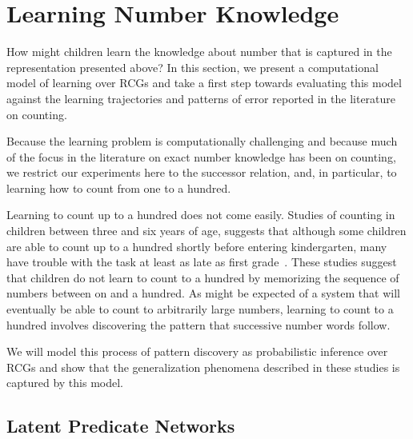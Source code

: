 \documentclass[10pt,letterpaper]{article}
\begin{document}
\section{Learning Number Knowledge}

How might children learn the knowledge about number that is captured
in the representation presented above? In this section, we present a
computational model of learning over RCGs and take a first step
towards evaluating this model against the learning trajectories and
patterns of error reported in the literature on counting. 

Because the learning problem is computationally challenging and
because much of the focus in the literature on exact number knowledge
has been on counting, we restrict our experiments here to the
successor relation, and, in particular, to learning how to count from
one to a hundred.

Learning to count up to a hundred does not come easily. Studies of
counting in children between three and six years of age, suggests that
although some children are able to count up to a hundred shortly
before entering kindergarten, many have trouble with the task at least
as late as first
grade~\cite{FusRicBriar1982,miller1987counting}. These studies suggest
that children do not learn to count to a hundred by memorizing the
sequence of numbers between on and a hundred. As might be expected of
a system that will eventually be able to count to arbitrarily large
numbers, learning to count to a hundred involves discovering the
pattern that successive number words follow. 

We will model this process of pattern discovery as probabilistic
inference over RCGs and show that the generalization phenomena
described in these studies is captured by this model. 

\subsection{Latent Predicate Networks}
\end{document}
